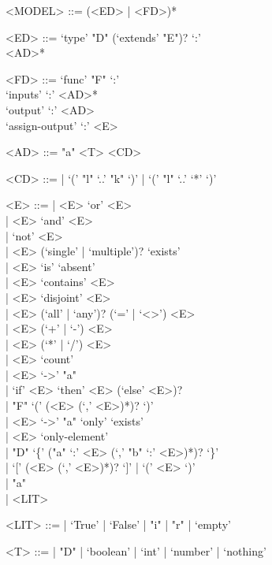 \begin{defbox}[2]
\begin{grammar}
<MODEL> ::= 
  (<ED> | <FD>)*

<ED> ::= 
  `type' "D" (`extends' "E")? `:'\\
\ind <AD>*

<FD> ::= 
  `func' "F" `:'\\
\ind `inputs' `:' <AD>*\\
\ind `output' `:' <AD>\\
\ind `assign-output' `:' <E>

<AD> ::= 
  "a" <T> <CD>

<CD> ::= 
  | `(' "l" `..' "k" `)' 
  | `(' "l" `..' `*' `)' 

<E> ::= 
  | <E> `or' <E>\\
  | <E> `and' <E>\\
  | `not' <E>\\
  | <E> (`single' | `multiple')? `exists'\\
  | <E> `is' `absent'\\
  | <E> `contains' <E>\\
  | <E> `disjoint' <E>\\
  | <E> (`all' | `any')? (`=' | `<>') <E>\\
  | <E> (`+' | `-') <E>\\
  | <E> (`*' | `/') <E>\\
  | <E> `count'\\
  | <E> `->' "a"\\
  | `if' <E> `then' <E> (`else' <E>)?\\
  | "F" `(' (<E> (`,' <E>)*)? `)'\\
  | <E> `->' "a" `only' `exists'\\
  | <E> `only-element'\\
  | "D" `\{' ("a" `:' <E> (`,' "b" `:' <E>)*)? `\}'\\
  | `[' (<E> (`,' <E>)*)? `]'
  | `(' <E> `)'\\
  | "a"\\
  | <LIT>

<LIT> ::= 
  | `True' | `False' 
  | "i" 
  | "r" 
  | `empty' 

<T> ::= 
  | "D"
  | `boolean'
  | `int'
  | `number'
  | `nothing'
\end{grammar}
\end{defbox}
